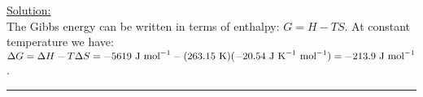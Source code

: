 \noindent
\underline{Solution:}\\

The Gibbs energy can be written in terms of enthalpy: $G = H - TS$. At constant temperature we have: $\Delta G = \Delta H - T\Delta S = -5619 \textnormal{ J mol}^{-1} - (263.15 \textnormal{ K})(-20.54\textnormal{ J K}^{-1}\textnormal{ mol}^{-1}) = -213.9\textnormal{ J mol}^{-1}$.

\hrule\vspace{0.5cm}

